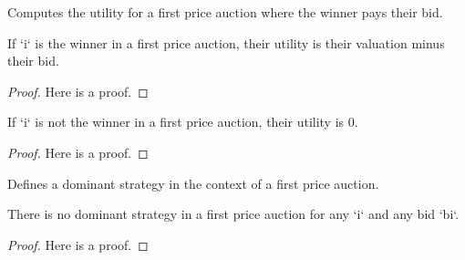 \begin{definition}\label{Utility.FirstPrice}
    \leanok
    Computes the utility for a first price auction where the winner pays their bid.
\end{definition}

\begin{lemma}\label{utility_first_price_winner}
    \leanok
    If `i` is the winner in a first price auction, their utility is their valuation minus their bid.
\end{lemma}
\begin{proof}
    Here is a proof.
\end{proof}

\begin{lemma}\label{utility_first_price_loser}
    \leanok
    If `i` is not the winner in a first price auction, their utility is 0.
\end{lemma}
\begin{proof}
    Here is a proof.
\end{proof}

\begin{definition}\label{Dominant.FirstPrice}
    \leanok
    Defines a dominant strategy in the context of a first price auction.
\end{definition}

\begin{theorem}\label{first_price_has_no_dominant_strategy}
    \leanok
    There is no dominant strategy in a first price auction for any `i` and any bid `bi`.
\end{theorem}
\begin{proof}
    Here is a proof.
\end{proof}









